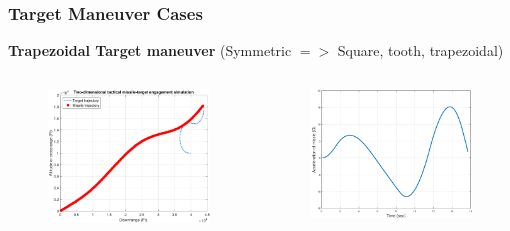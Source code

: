 \documentclass{beamer}
\begin{document}
\begin{frame}
\frametitle{Target Maneuver Cases}
\textbf{Trapezoidal Target maneuver} (Symmetric $=>$ Square, tooth, trapezoidal)
\begin{columns}[c]
	\begin{column}{.3\linewidth}
		\begin{figure}
			\centering
			\includegraphics[scale = 0.18]{fig/trajectoryTrapSymm.pdf}
		\end{figure}
	\end{column}
	
	\begin{column}{.3\linewidth}
		\begin{figure}
			\centering
			\includegraphics[scale = 0.18]{fig/MissileAccelerationTrapSymm.pdf}
		\end{figure}
	\end{column}
	

\end{columns}
\end{frame}
\end{document}
